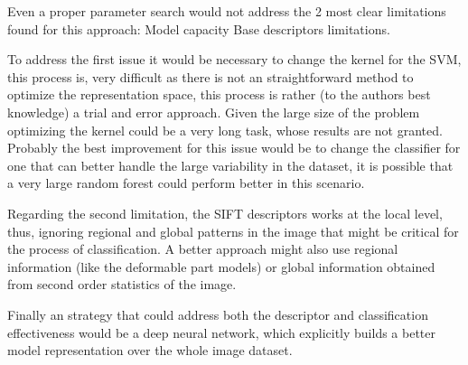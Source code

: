 \documentclass[10pt,twocolumn,letterpaper]{article}
\begin{document}
Even a proper parameter search would not address the 2 most clear limitations found for this approach: Model capacity Base descriptors limitations.

To address the first issue it would be necessary to change the kernel for the SVM, this process is, very difficult as there is not an straightforward method to optimize the representation space,  this process is rather (to the authors best knowledge) a trial and error approach. Given the large size of the problem optimizing the kernel  could be a very long task, whose results are not granted. Probably the best improvement for this issue would be to change the classifier for one that can better handle the large variability in the dataset, it is possible that a very large random forest could perform better in this scenario.

Regarding the second limitation, the SIFT descriptors works at the local level, thus, ignoring regional and global patterns in the image that might be critical for the process of classification. A better approach might also use regional information (like the deformable part models\cite{Felzenszwalb2010}) or global information obtained from second order statistics of the image.

Finally an strategy that could address both the descriptor and classification effectiveness would be a deep neural network, which explicitly builds a better model representation over the whole image dataset.

{\small


}
\end{document}
